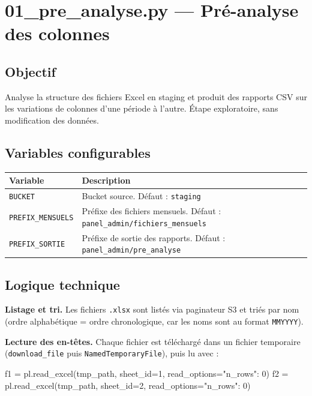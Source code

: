 \documentclass[12pt,a4paper,french]{report}
\begin{document}
\section{01\_pre\_analyse.py — Pré-analyse des colonnes}

\subsection{Objectif}

Analyse la structure des fichiers Excel en staging et produit des rapports
CSV sur les variations de colonnes d'une période à l'autre. Étape exploratoire,
sans modification des données.

\subsection{Variables configurables}

\begin{tabularx}{\textwidth}{lX}
  \toprule
  \textbf{Variable} & \textbf{Description} \\
  \midrule
  \texttt{BUCKET} & Bucket source. Défaut : \texttt{staging} \\
  \texttt{PREFIX\_MENSUELS} & Préfixe des fichiers mensuels.
    Défaut : \texttt{panel\_admin/fichiers\_mensuels} \\
  \texttt{PREFIX\_SORTIE} & Préfixe de sortie des rapports.
    Défaut : \texttt{panel\_admin/pre\_analyse} \\
  \bottomrule
\end{tabularx}

\subsection{Logique technique}

\textbf{Listage et tri.} Les fichiers \texttt{.xlsx} sont listés via
paginateur S3 et triés par nom (ordre alphabétique = ordre chronologique,
car les noms sont au format \texttt{MMYYYY}).

\textbf{Lecture des en-têtes.} Chaque fichier est téléchargé dans un fichier
temporaire (\texttt{download\_file} puis \texttt{NamedTemporaryFile}), puis lu
avec :

\begin{codebox}[]
f1 = pl.read\_excel(tmp\_path, sheet\_id=1, read\_options={"n\_rows": 0})
f2 = pl.read\_excel(tmp\_path, sheet\_id=2, read\_options={"n\_rows": 0})
\end{codebox}
\end{document}
